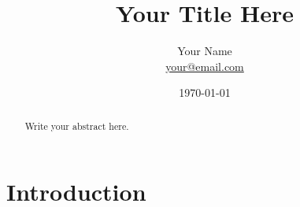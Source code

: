 \documentclass{tufte-handout}
\title{Your Title Here}
\author{Your Name \\ \href{mailto:your@email.com}{your@email.com}}
\date{\today}
\begin{document}
\maketitle
\begin{abstract}
    Write your abstract here.
\end{abstract}

\newpage
\hypersetup{linkcolor=wp-text}
\tableofcontents
\hypersetup{linkcolor=wp-primary}
\newpage

\section{Introduction}
\end{document}
